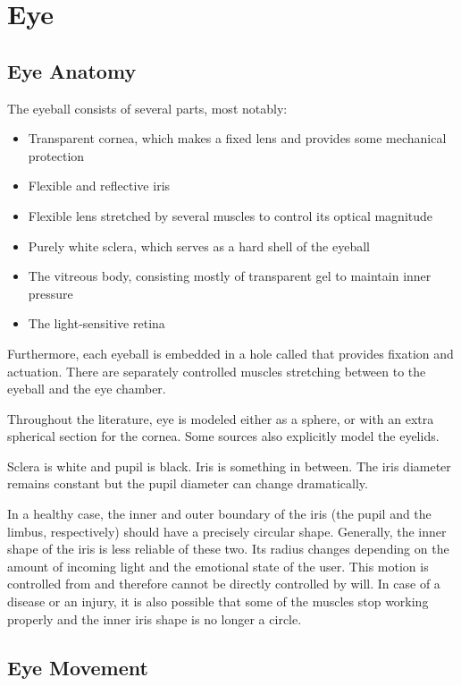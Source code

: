\section{Eye}
\subsection{Eye Anatomy}
\label{s.eyeanatomy}

The eyeball consists of several parts, most notably:
\begin{itemize}
\item Transparent cornea, which makes a fixed lens and provides some mechanical protection
\item Flexible and reflective iris
\item Flexible lens stretched by several muscles to control its optical magnitude
\item Purely white sclera, which serves as a hard shell of the eyeball
\item The vitreous body, consisting mostly of transparent gel to maintain inner pressure
\item The light-sensitive retina
\end{itemize}

Furthermore, each eyeball is embedded in a hole called  that provides fixation and actuation.
There are  separately controlled muscles stretching between to the eyeball and the eye chamber.

Throughout the literature, eye is modeled either as a sphere, or with an extra spherical section for the cornea.
Some sources also explicitly model the eyelids.

Sclera is white and pupil is black.
Iris is something in between.
The iris diameter remains constant but the pupil diameter can change dramatically.

In a healthy case, the inner and outer boundary of the iris (the pupil and the limbus, respectively) should have a precisely circular shape.
Generally, the inner shape of the iris is less reliable of these two.
Its radius changes depending on the amount of incoming light and the emotional state of the user.
This motion is controlled from  and therefore cannot be directly controlled by will.
In case of a disease or an injury, it is also possible that some of the muscles stop working properly and the inner iris shape is no longer a circle.

\subsection{Eye Movement}


